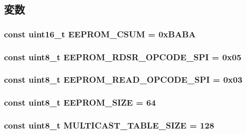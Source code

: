 \subsection{変数}
\hypertarget{namespaceiGbReg_a1860fbe30f4a9e9a36847405cf7ed5d9}{
\subsubsection[{EEPROM\_\-CSUM}]{\setlength{\rightskip}{0pt plus 5cm}const uint16\_\-t {\bf EEPROM\_\-CSUM} = 0xBABA}}
\label{namespaceiGbReg_a1860fbe30f4a9e9a36847405cf7ed5d9}
\hypertarget{namespaceiGbReg_a5327659659ed1abd6db6bf00e9b74746}{
\subsubsection[{EEPROM\_\-RDSR\_\-OPCODE\_\-SPI}]{\setlength{\rightskip}{0pt plus 5cm}const uint8\_\-t {\bf EEPROM\_\-RDSR\_\-OPCODE\_\-SPI} = 0x05}}
\label{namespaceiGbReg_a5327659659ed1abd6db6bf00e9b74746}
\hypertarget{namespaceiGbReg_a58a0832d5420b8f5624fcb7f29eaa638}{
\subsubsection[{EEPROM\_\-READ\_\-OPCODE\_\-SPI}]{\setlength{\rightskip}{0pt plus 5cm}const uint8\_\-t {\bf EEPROM\_\-READ\_\-OPCODE\_\-SPI} = 0x03}}
\label{namespaceiGbReg_a58a0832d5420b8f5624fcb7f29eaa638}
\hypertarget{namespaceiGbReg_adb0e1024d46141c966014951f5b1e5c8}{
\subsubsection[{EEPROM\_\-SIZE}]{\setlength{\rightskip}{0pt plus 5cm}const uint8\_\-t {\bf EEPROM\_\-SIZE} = 64}}
\label{namespaceiGbReg_adb0e1024d46141c966014951f5b1e5c8}
\hypertarget{namespaceiGbReg_add8f1abdb23d74212253f11efe13a39e}{
\subsubsection[{MULTICAST\_\-TABLE\_\-SIZE}]{\setlength{\rightskip}{0pt plus 5cm}const uint8\_\-t {\bf MULTICAST\_\-TABLE\_\-SIZE} = 128}}

